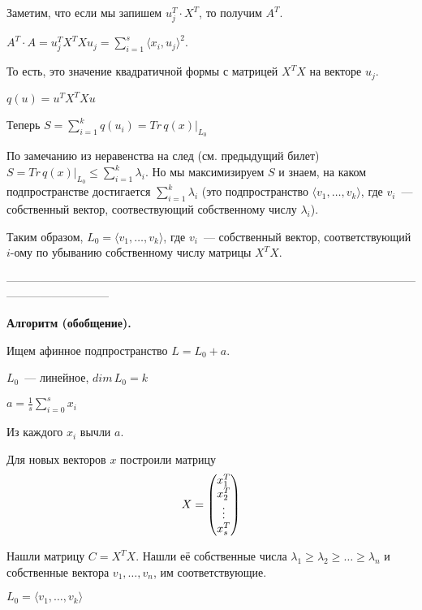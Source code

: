 Заметим, что если мы запишем $u_j^T\cdot X^T$, то получим $A^T$.

$A^T\cdot A = u_j^TX^TXu_j = \sum\limits_{i = 1}^s\langle x_i, u_j\rangle^2$.

То есть, это значение квадратичной формы с матрицей $X^TX$ на векторе $u_j$.

$q(u) = u^TX^TXu$

Теперь $S = \sum\limits_{i = 1}^k q(u_i) = Tr\, q(x)|_{L_0}$

По замечанию из неравенства на след (см. предыдущий билет) $S = Tr\,q(x)|_{L_0} \le \sum\limits_{i = 1}^k \lambda_i$. Но мы максимизируем $S$ и знаем, на каком подпространстве достигается $\sum\limits_{i = 1}^k \lambda_i$ (это подпространство $\langle v_1,\ldots, v_k\rangle$, где $v_i$~--- собственный вектор, соотвествующий собственному числу $\lambda_i$).

Таким образом, $L_0 = \langle v_1,\ldots,v_k\rangle$, где $v_i$~--- собственный вектор, соответствующий $i$-ому по убыванию собственному числу матрицы $X^TX$.

---------------------------------------------------------------------------------------------------------------------------------------

{\bf Алгоритм (обобщение).}

Ищем афинное подпространство $L = L_0 + a$.

$L_0$~--- линейное, $dim\,L_0 = k$

$a = \frac{1}{s}\sum\limits_{i = 0}^s x_i$

Из каждого $x_i$ вычли $a$.

Для новых векторов $x$ построили матрицу 
$$
X=\begin{pmatrix}
x_1^T\\
x_2^T\\
\vdots\\
x_s^T
\end{pmatrix}
$$

Нашли матрицу $C = X^TX$. Нашли её собственные числа $\lambda_1\ge\lambda_2\ge\ldots\ge\lambda_n$ и собственные вектора $v_1,\ldots, v_n$, им соответствующие.

$L_0 = \langle v_1,\ldots,v_k\rangle$

